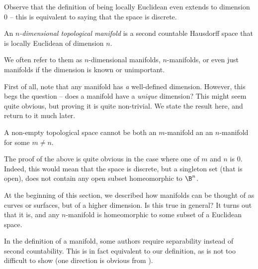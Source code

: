 Observe that the definition of being locally Euclidean even extends to dimension $0$ -- this is equivalent to saying that the space is discrete.

\begin{fdef}[Manifold]
	An \textit{$n$-dimensional topological manifold} is a second countable Hausdorff space that is locally Euclidean of dimension $n$.
\end{fdef}

We often refer to them as $n$-dimensional manifolds, $n$-manifolds, or even just manifolds if the dimension is known or unimportant.

First of all, note that any manifold has \textit{a} well-defined dimension. However, this begs the question -- does a manifold have a \textit{unique} dimension? This might seem quite obvious, but proving it is quite non-trivial. We state the result here, and return to it much later.

\begin{ftheo}
	A non-empty topological space cannot be both an $m$-manifold an an $n$-manifold for some $m\neq n$.
\end{ftheo}

The proof of the above is quite obvious in the case where one of $m$ and $n$ is $0$. Indeed, this would mean that the space is discrete, but a singleton set (that is open), does not contain any open subset homeomorphic to $\B^n$.

At the beginning of this section, we described how manifolds can be thought of as curves or surfaces, but of a higher dimension. Is this true in general? It turns out that it is, and any $n$-manifold is homeomorphic to some subset of a Euclidean space.

In the definition of a manifold, some authors require separability instead of second countability. This is in fact equivalent to our definition, as is not too difficult to show (one direction is obvious from ).
